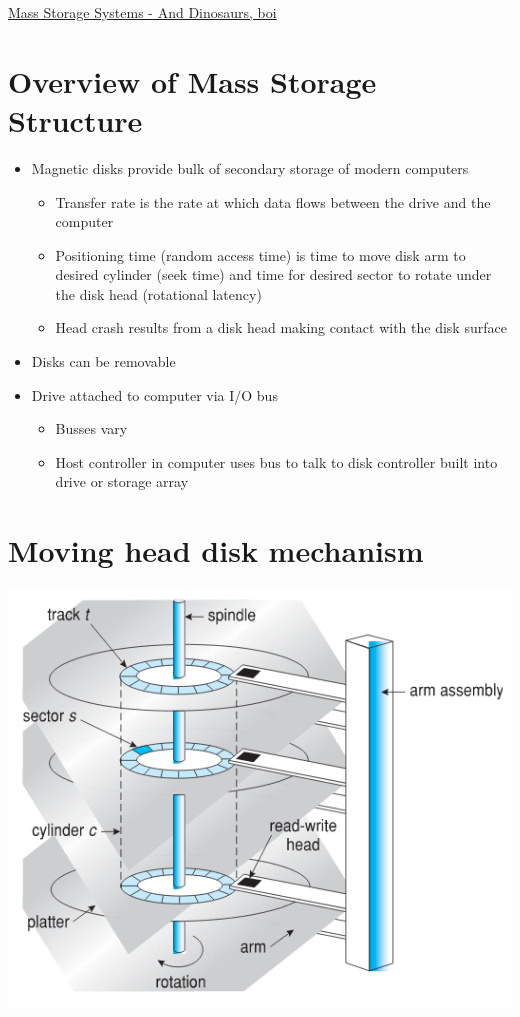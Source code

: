 \documentclass{article}[18pt]
\begin{document}
\begin{center}
\underline{\huge Mass Storage Systems - And Dinosaurs, boi}
\end{center}
\section{Overview of Mass Storage Structure}
\begin{itemize}
	\item Magnetic disks provide bulk of secondary storage of modern computers
	\begin{itemize}
		\item Transfer rate is the rate at which data flows between the drive and the computer
		\item Positioning time (random access time) is time to move disk arm to desired cylinder (seek time) and time for desired sector to rotate under the disk head (rotational latency)
		\item Head crash results from a disk head making contact with the disk surface
	\end{itemize}
	\item Disks can be removable
	\item Drive attached to computer via I/O bus
	\begin{itemize}
		\item Busses vary
		\item Host controller in computer uses bus to talk to disk controller built into drive or storage array
	\end{itemize} 
\end{itemize}
\section{Moving head disk mechanism}
\begin{center}
	\includegraphics[scale=0.7]{mechanism}
\end{center}
\end{document}
